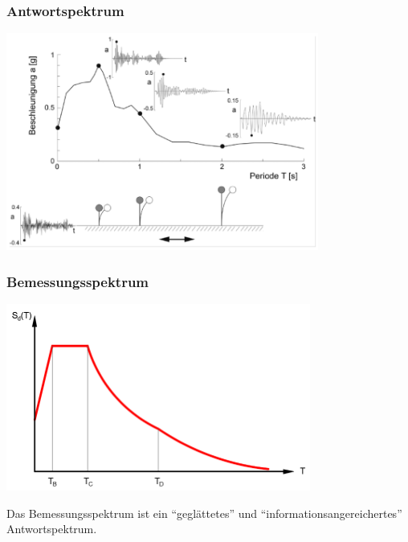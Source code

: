 \begin{frame}
\frametitle{Antwortspektrum}  %
\includegraphics[width=0.77\textwidth]{fig_img/antwortspektrum} %
\end{frame}


\begin{frame}
\frametitle{Bemessungsspektrum}  %
\includegraphics[width=0.75\textwidth]{fig_img/bemessungsspektrum} %

Das Bemessungsspektrum ist ein ``geglättetes'' und ``informationsangereichertes'' Antwortspektrum. 
\end{frame}

